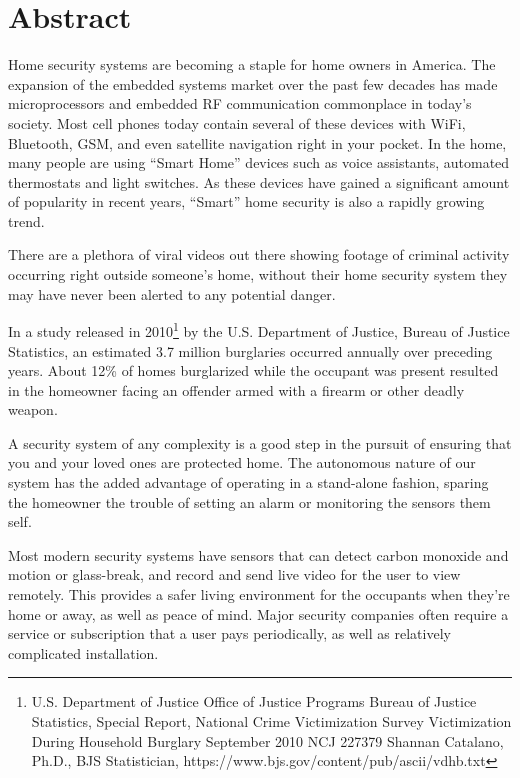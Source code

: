\documentclass[a4paper,11pt]{report}
\begin{document}
		\section{Abstract}
	\par Home security systems are becoming a staple for home owners in America. The expansion of the embedded systems market over the past few decades has made microprocessors and embedded RF communication commonplace in today's society. Most cell phones today contain several of these devices with WiFi, Bluetooth, GSM, and even satellite navigation right in your pocket. In the home, many people are using “Smart Home” devices such as voice assistants, automated thermostats and light switches. As these devices have gained a significant amount of popularity in recent years, “Smart” home security is also a rapidly growing trend. 
	\par There are a plethora of viral videos out there showing footage of criminal activity occurring right outside someone's home, without their home security system they may have never been alerted to any potential danger. 
	\par In a study released in 2010\footnote{
		U.S. Department of Justice
		Office of Justice Programs
		Bureau of Justice Statistics, Special Report, National Crime Victimization Survey
		Victimization During Household Burglary
		September 2010   NCJ 227379
		Shannan Catalano, Ph.D., 
		BJS Statistician,
		https://www.bjs.gov/content/pub/ascii/vdhb.txt
	} by the U.S. Department of Justice, Bureau of Justice Statistics, an estimated 3.7 million burglaries occurred annually over preceding years. About 12\% of homes burglarized while the occupant was present resulted in the homeowner facing an offender armed with a firearm or other deadly weapon. 
	\par A security system of any complexity is a good step in the pursuit of ensuring that you and your loved ones are protected home. The autonomous nature of our system has the added advantage of operating in a stand-alone fashion, sparing the homeowner the trouble of setting an alarm or monitoring the sensors them self. 
	\par Most modern security systems have sensors that can detect carbon monoxide and motion or glass-break, and record and send live video for the user to view remotely. This provides a safer living environment for the occupants when they’re home or away, as well as peace of mind. Major security companies often require a service or subscription that a user pays periodically, as well as relatively complicated installation.  
\end{document}

